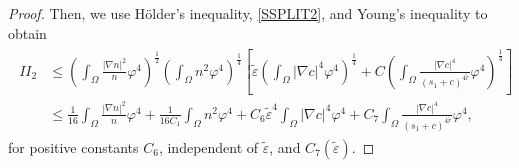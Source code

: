 \documentclass{amsart}
\numberwithin{equation}{section}
\newcommand{\bke}[1]{\left( #1 \right)}
\newcommand{\bkt}[1]{\left[ #1 \right]}
\begin{document}
\begin{proof}

Then, we use H\"older's inequality, \eqref{SSPLIT2}, and Young's inequality to obtain 
\begin{align}\label{DEC20232}
\begin{aligned}
II_2
&\le \bke{\int_{\Omega} \frac{|\nabla n|^{2}}{n}\varphi^{4}}^{\frac{1}{2}}
\bke{\int_{\Omega}n^{2}\varphi^{4}}^{\frac{1}{4}}\bkt{\tilde{\varepsilon}\bke{\int_{\Omega} |\nabla c|^{4} \varphi^{4}}^{\frac{1}{4}}+C\bke{\int_{\Omega}\frac{|\nabla c|^{4}}{(s_{1}+c)^{4\tilde{r}}}\varphi^{4}}^{\frac{1}{4}}}
\\&\le\frac{1}{16} \int_{\Omega} \frac{|\nabla n|^{2}}{n}\varphi^{4} +
\frac{1}{16C_{1}}\int_{\Omega}n^{2}\varphi^{4} +  C_{6}\tilde{\varepsilon}^{4}\int_{\Omega}|\nabla c|^{4}\varphi^{4}+C_{7}\int_{\Omega}\frac{|\nabla c|^{4}}{(s_{1}+c)^{4\tilde{r}}}\varphi^{4},
\end{aligned}
\end{align}
for positive constants $C_{6}$, independent of $\tilde{\varepsilon}$, and $C_{7}(\tilde{\varepsilon})$. 


\end{proof}
\end{document}
